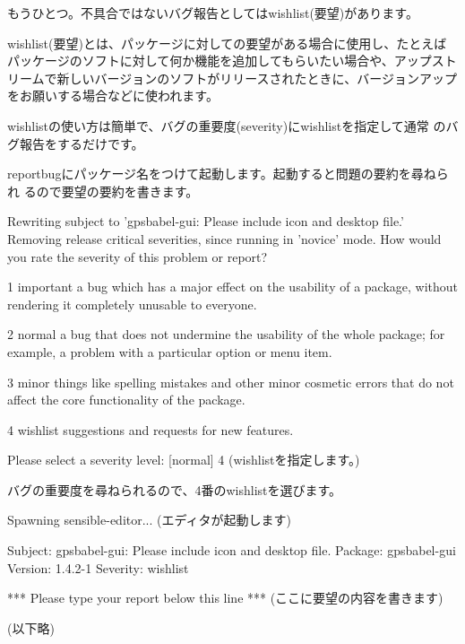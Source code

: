 \documentclass[mingoth,a4paper]{jsarticle}
\begin{document}
もうひとつ。不具合ではないバグ報告としてはwishlist(要望)があります。

wishlist(要望)とは、パッケージに対しての要望がある場合に使用し、たとえば
パッケージのソフトに対して何か機能を追加してもらいたい場合や、アップスト
リームで新しいバージョンのソフトがリリースされたときに、バージョンアップ
をお願いする場合などに使われます。

wishlistの使い方は簡単で、バグの重要度(severity)にwishlistを指定して通常
のバグ報告をするだけです。


reportbugにパッケージ名をつけて起動します。起動すると問題の要約を尋ねられ
るので要望の要約を書きます。

\begin{commandline}
Rewriting subject to 'gpsbabel-gui: Please include icon and desktop file.'
Removing release critical severities, since running in 'novice' mode.
How would you rate the severity of this problem or report?

1 important  a bug which has a major effect on the usability of a package,
             without rendering it completely unusable to everyone.

2 normal     a bug that does not undermine the usability of the whole package;
             for example, a problem with a particular option or menu item.

3 minor      things like spelling mistakes and other minor cosmetic errors
             that do not affect the core functionality of the package.

4 wishlist   suggestions and requests for new features.

Please select a severity level: [normal] 4 (wishlistを指定します。)
\end{commandline}

バグの重要度を尋ねられるので、4番のwishlistを選びます。

\begin{commandline}
Spawning sensible-editor... (エディタが起動します)

Subject: gpsbabel-gui: Please include icon and desktop file.
Package: gpsbabel-gui
Version: 1.4.2-1
Severity: wishlist

*** Please type your report below this line ***
(ここに要望の内容を書きます)

(以下略)
\end{commandline}
\end{document}
